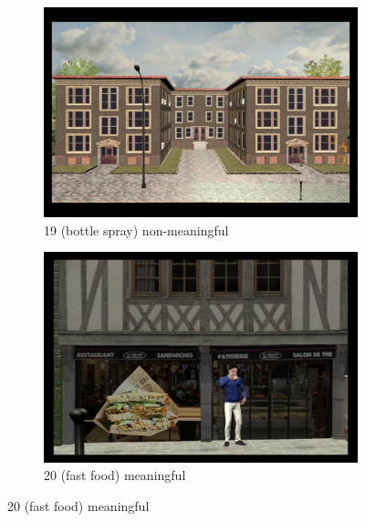 \begin{figure}[!htb]
	\begin{subfigure}[b]{0.48\linewidth}
		\includegraphics[width=\linewidth]{figures/starting_locations_appx/19_R(bottle spray)_A.PNG}
		\caption{19 (bottle spray) non-meaningful}
		\label{fig:19_R(bottle spray)_A}
	\end{subfigure}
	\begin{subfigure}[b]{0.48\linewidth}
		\includegraphics[width=\linewidth]{figures/starting_locations_appx/20_S(fast food)_A.PNG}
		\caption{20 (fast food) meaningful}
		\label{fig:20_S(fast food)_A}
	\end{subfigure}
	

\end{figure}
